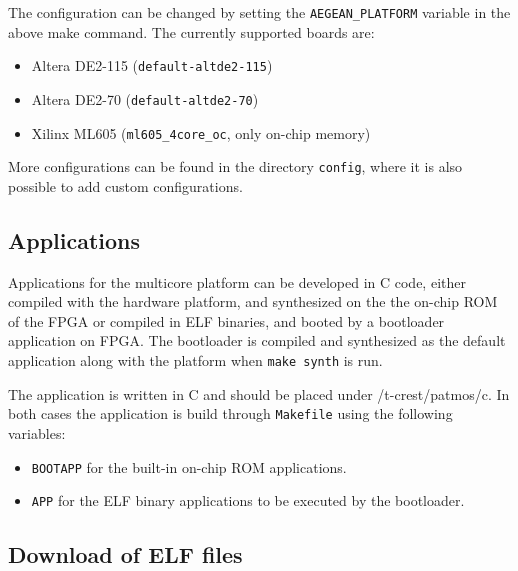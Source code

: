 \documentclass[a4paper,fontsize=10pt,twoside,DIV15,BCOR12mm,headinclude=true,footinclude=false,pagesize,bibtotoc]{scrbook}
\newcommand{\code}[1]{{\texttt{#1}}}
\begin{document}
The configuration can be changed by setting the \code{AEGEAN\_PLATFORM}
variable in the above make command. The currently supported boards are:
\begin{itemize}
\item Altera DE2-115 (\code{default-altde2-115})
\item Altera DE2-70 (\code{default-altde2-70})
\item Xilinx ML605 (\code{ml605\_4core\_oc}, only on-chip memory)
\end{itemize}
More configurations can be found in the directory \code{config}, where
it is also possible to add custom configurations.

\subsection{Applications}

Applications for the multicore platform can be developed in C code, either 
compiled with the hardware platform, and synthesized on the the on-chip ROM of the FPGA
or compiled in ELF binaries, and booted by a bootloader application on FPGA.
The bootloader is compiled and synthesized as the default application 
along with the platform when \code{make synth} is run.


The application is written in C and should be placed under /t-crest/patmos/c.
In both cases the application is build through \code{Makefile} using the following variables:

\begin{itemize}
\item \code{BOOTAPP} for the built-in on-chip ROM applications.
\item \code{APP} for the ELF binary applications to be executed by the bootloader.
\end{itemize}

%

\subsection{Download of ELF files}
\end{document}
